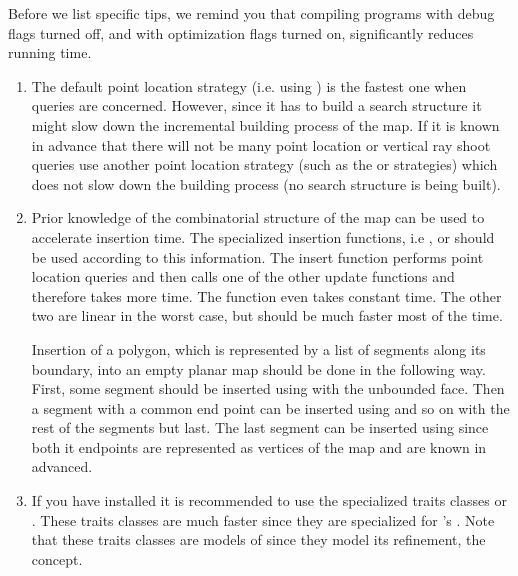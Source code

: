 Before we list specific tips, we remind you that compiling
programs with debug flags turned off, and with optimization flags
turned on, significantly reduces running time.

\begin{enumerate}
   \item The default point location strategy (i.e. using
   ) is the fastest one when queries
   are concerned. However, since it has to build a search structure it
   might slow down the incremental building process of the map. If it
   is known in advance that there will not be many point location or
   vertical ray shoot queries use another point location strategy
   (such as the  or  strategies) which does not
   slow down the building process (no search structure is being
   built).

   \item Prior knowledge of the combinatorial structure of the map can
   be used to accelerate insertion time. The specialized insertion
   functions, i.e ,
    or  should be used
   according to this information. The insert function performs point
   location queries and then calls one of the other update functions
   and therefore takes more time.  The function
    even takes constant time. The other
   two are linear in the worst case, but should be much faster most of
   the time.

   Insertion of a polygon, which is represented by a list of segments
   along its boundary, into an empty planar map should be done in the
   following way. First, some segment should be inserted using
    with the unbounded face. Then a
   segment with a common end point can be inserted using
    and so on with the rest of the segments
   but last. The last segment can be inserted using
    since both it endpoints are represented as
   vertices of the map and are known in advanced.
 
   \item If you have \leda\/ installed it is recommended to use
   the specialized traits classes 
   or . These traits classes are much
   faster since they are specialized for \leda\/'s . Note that these traits classes are models of
    since they model its refinement, the
    concept.

\end{enumerate}

